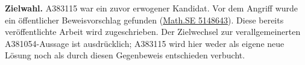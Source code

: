 \documentclass[11pt,a4paper]{article}
\begin{document}
\medskip
\noindent\textbf{Zielwahl.} A383115 war ein zuvor erwogener Kandidat. Vor dem Angriff
wurde ein öffentlicher Beweisvorschlag gefunden
(\href{https://math.stackexchange.com/questions/5148643/}{Math.SE 5148643}).
Diese bereits veröffentlichte Arbeit wird zugeschrieben. Der Zielwechsel zur
verallgemeinerten A381054-Aussage ist ausdrücklich; A383115 wird hier weder als
eigene neue Lösung noch als durch diesen Gegenbeweis entschieden verbucht.
\end{document}

